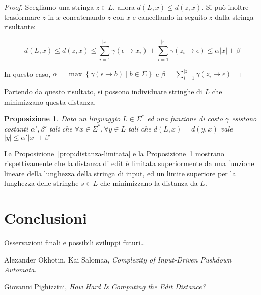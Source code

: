 \documentclass[a4paper,12pt]{report}
\theoremstyle{propositionstyle}
\newtheorem{prop}{Proposizione}[chapter]
\begin{document}
    \begin{proof}
        Scegliamo una stringa $z \in L$, allora $d\left(L, x\right) \leq d\left(z, x\right)$.
        Si può inoltre trasformare $z$ in $x$ concatenando $z$ con $x$ e cancellando in seguito $z$ dalla stringa risultante:

        $$\displaystyle d\left(L, x\right) \leq d\left(z, x\right) \leq \sum_{i=1}^{\lvert x \rvert} \gamma\left(\epsilon \rightarrow x_i\right) + \sum_{i=1}^{\lvert z \rvert} \gamma\left(z_i \rightarrow \epsilon\right) \leq \alpha \lvert x \rvert + \beta$$

        In questo caso, $\alpha = \max\left\{\gamma\left(\epsilon \rightarrow b\right) \mid b \in \Sigma\right\}$ e $\beta = \sum_{i=1}^{\lvert z \rvert} \gamma\left(z_i \rightarrow \epsilon\right)$
    \end{proof}

    Partendo da questo risultato, si possono individuare stringhe di $L$ che minimizzano questa distanza.

    \begin{prop}\label{prop:stringa-limitata}
        Dato un linguaggio $L \in \Sigma^*$ ed una funzione di costo $\gamma$ esistono costanti $\alpha', \beta'$ tali che
        $\forall{x \in \Sigma^*}, \forall{y \in L}$ tali che $d\left(L, x\right) = d\left(y, x\right)$ vale $\lvert y \rvert \leq \alpha' \lvert x \rvert + \beta'$
    \end{prop}

    La Proposizione~\ref{prop:distanza-limitata} e la Proposizione~\ref{prop:stringa-limitata} mostrano rispettivamente che la distanza di edit è limitata superiormente da una funzione lineare della lunghezza della stringa di input, ed un limite superiore per la lunghezza delle stringhe $s \in L$ che minimizzano la distanza da $L$.


    \section{Conclusioni}

    Osservazioni finali e possibili sviluppi futuri\ldots

    \clearpage
    \begin{thebibliography}{9}

        Alexander Okhotin, Kai Salomaa,
        \textit{Complexity of Input-Driven Pushdown Automata}.

        Giovanni Pighizzini,
        \textit{How Hard Is Computing the Edit Distance?}


    \end{thebibliography}
\end{document}
